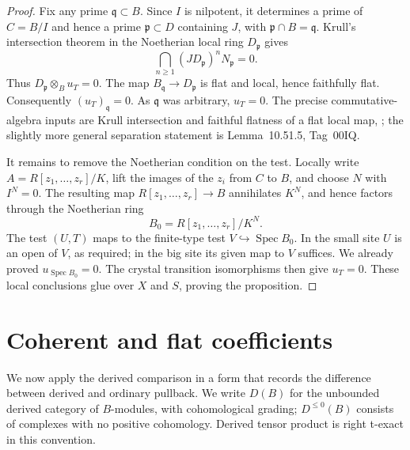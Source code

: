 \documentclass[11pt]{article}
\DeclareMathOperator{\Spec}{Spec}\DeclareMathOperator{\Hom}{Hom}
\theoremstyle{definition}\newtheorem{definition}[theorem]{Definition}
\theoremstyle{remark}\newtheorem{remark}[theorem]{Remark}
\begin{document}
\begin{proof}
Fix any prime $\mathfrak q\subset B$.  Since $I$ is nilpotent, it determines a prime of $C=B/I$ and hence a prime $\mathfrak p\subset D$ containing $J$, with $\mathfrak p\cap B=\mathfrak q$.  Krull's intersection theorem in the Noetherian local ring $D_{\mathfrak p}$ gives
\[
 \bigcap_{n\geq1}(JD_{\mathfrak p})^nN_{\mathfrak p}=0.
\]
Thus $D_{\mathfrak p}\otimes_Bu_T=0$.  The map $B_{\mathfrak q}\to D_{\mathfrak p}$ is flat and local, hence faithfully flat.  Consequently $(u_T)_{\mathfrak q}=0$.  As $\mathfrak q$ was arbitrary, $u_T=0$.  The precise commutative-algebra inputs are Krull intersection and faithful flatness of a flat local map, \citet[Lemmas~10.51.4 and~10.39.17, Tags~00IP and~00HR]{StacksProject}; the slightly more general separation statement is Lemma~10.51.5, Tag~00IQ.

It remains to remove the Noetherian condition on the test.  Locally write $A=R[z_1,\ldots,z_r]/K$, lift the images of the $z_i$ from $C$ to $B$, and choose $N$ with $I^N=0$.  The resulting map $R[z_1,\ldots,z_r]\to B$ annihilates $K^N$, and hence factors through the Noetherian ring
\[
 B_0=R[z_1,\ldots,z_r]/K^N.
\]
The test $(U,T)$ maps to the finite-type test
$V\hookrightarrow\Spec B_0$.  In the small site $U$ is an open of $V$, as required; in the big site its given map to $V$ suffices.  We already proved $u_{\Spec B_0}=0$.  The crystal transition isomorphisms then give $u_T=0$.  These local conclusions glue over $X$ and $S$, proving the proposition.
\end{proof}

\section{Coherent and flat coefficients}

We now apply the derived comparison in a form that records the difference between derived and ordinary pullback. We write $D(B)$ for the unbounded derived category of $B$-modules, with cohomological grading; $D^{\leq0}(B)$ consists of complexes with no positive cohomology. Derived tensor product is right t-exact in this convention.
\end{document}
